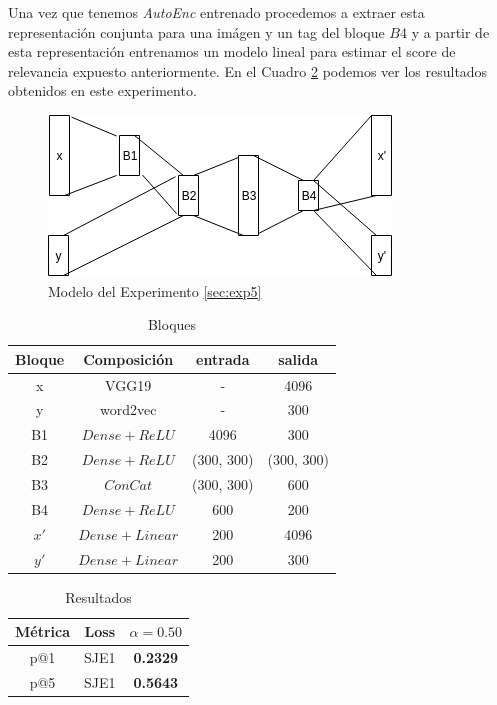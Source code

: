 Una vez que tenemos \textit{AutoEnc} entrenado procedemos a extraer esta representación conjunta para una imágen y un tag del bloque $B4$ y a partir de esta representación entrenamos un modelo lineal para estimar el score de relevancia expuesto anteriormente. En el Cuadro \ref{tab:results_exp5_autoencoder} podemos ver los resultados obtenidos en este experimento.


\begin{figure}
\begin{center}
    \includegraphics[width=\textwidth]{images/autoencoder_arch.png}
    \caption{Modelo del Experimento \ref{sec:exp5}}
    \label{fig:exp5_autoencoder}
\end{center}
\end{figure}


\begin{table}[ht]
    \centering
    \begin{tabular}{|c|c|c|c|}
        \hline
        \textbf{Bloque} &
        \textbf{Composición} &
        \textbf{entrada} &
        \textbf{salida} \\
        \hline \hline
        x & VGG19 & - & 4096 \\
        y & word2vec & - & 300  \\
        B1 & $Dense + ReLU $ & 4096 & 300    \\
        B2 & $Dense + ReLU$ & (300, 300) & (300, 300)  \\
        B3 & $ConCat$ & (300, 300) & 600  \\
        B4 & $Dense + ReLU$ & 600 & 200  \\
        $x'$ & $Dense + Linear$ & 200 & 4096 \\
        $y'$ & $Dense + Linear$ & 200 & 300 \\
        \hline
    \end{tabular}
    \caption{Bloques}
    \label{tab:bloques_exp4_custom_model}
\end{table}


\begin{table}[ht]
    \centering
    \begin{tabular}{|c|c|c|}
        \hline
        \textbf{Métrica} &
        \textbf{Loss} &
        \textbf{$\alpha = 0.50$}\\
        \hline \hline
        p@1 & SJE1 & \textbf{0.2329} \\
        p@5 & SJE1 & \textbf{0.5643} \\
        \hline
    \end{tabular}
    \caption{Resultados}
    \label{tab:results_exp5_autoencoder}
\end{table}